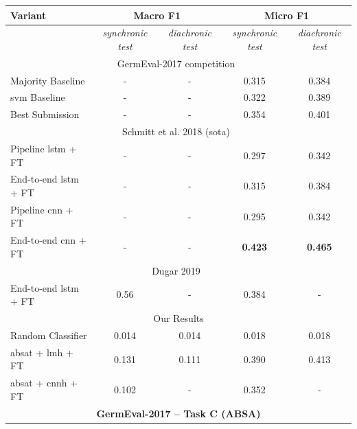 \begin{table}[htp]
	\centering
	\begin{tabular*}{\textwidth}{l@{\extracolsep{\fill}}cccc@{}}
	\toprule
	Variant          & \multicolumn{2}{c}{\textbf{Macro F1}}     & \multicolumn{2}{c}{\textbf{Micro F1}}       \\ 
	\midrule
					 & \textit{synchronic test}      	& \textit{diachronic test} 		& \textit{synchronic test}      		& \textit{diachronic test} 		\\
	\midrule
								 \multicolumn{5}{c}{GermEval-2017 competition~\cite{Wojatzki2017}} 					\\
	Majority Baseline        		 &  -        	&  -    	& 0.315        	&   0.384 							\\
	\gls{svm} Baseline        		 &  -        	&  -    	& 0.322        	&   0.389 							\\
	Best Submission 				 &  - 			&  - 		& 0.354 		& 0.401 							\\
	\midrule
								 \multicolumn{5}{c}{Schmitt et al. 2018 {(\gls{sota})}~\cite{Schmitt2018}} 		\\
	Pipeline \gls{lstm} + FT 		 & -        	& -    		& 0.297     	&   0.342							\\
	End-to-end \gls{lstm} + FT 		 & -        	& -    		& 0.315     	&   0.384 							\\
	Pipeline \gls{cnn} + FT 		 & -        	& -    		& 0.295     	&   0.342 							\\
	End-to-end \gls{cnn} + FT 		 & -        	& -    		& \textbf{0.423}&   \textbf{0.465} 					\\
	\midrule
	\multicolumn{5}{c}{Dugar 2019~\cite{Dugar2019}} 													\\
	End-to-end \gls{lstm} + FT 		 & 0.56        	& -    		&  0.384 &   - 					\\
	\midrule

								 \multicolumn{5}{c}{Our Results} 													\\

	Random Classifier          		 &  0.014   	& 0.014 	&  0.018  		&   0.018  							\\
	\gls{absat} + \gls{lmh} + FT     & 0.131        & 0.111		&  0.390    	&   0.413   							\\ 
	\gls{absat} + \gls{cnnh} + FT    & 0.102    	& -			&  0.352      	&   -   							\\ 
	\bottomrule
	\multicolumn{5}{c}{\textbf{GermEval-2017 -- Task C {(ABSA)}}} \\


\end{tabular*}
\end{table}
